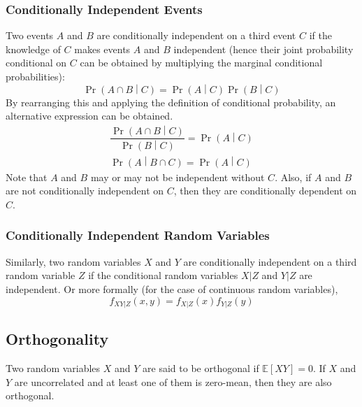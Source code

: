 \documentclass[11pt]{report} %
\begin{document}
\subsubsection{Conditionally Independent Events}
Two events $A$ and $B$ are conditionally independent on a third event $C$ if the knowledge of $C$ makes events $A$ and $B$ independent (hence their joint probability conditional on $C$ can be obtained by multiplying the marginal conditional probabilities):
\begin{equation}
\operatorname{Pr}\left(A\cap B\middle|C\right) = \operatorname{Pr}\left(A\middle|C\right)\operatorname{Pr}\left(B\middle|C\right)
\end{equation}
By rearranging this and applying the definition of conditional probability, an alternative expression can be obtained.
\begin{gather}
\dfrac{\operatorname{Pr}\left(A\cap B\middle|C\right)}{\operatorname{Pr}\left(B\middle|C\right)} = \operatorname{Pr}\left(A\middle|C\right) \\
\operatorname{Pr}\left(A\middle|B \cap C\right) = \operatorname{Pr}\left(A\middle|C\right)
\end{gather}
Note that $A$ and $B$ may or may not be independent without $C$. Also, if $A$ and $B$ are not conditionally independent on $C$, then they are conditionally dependent on $C$.

\subsubsection{Conditionally Independent Random Variables}

Similarly, two random variables $X$ and $Y$ are conditionally independent on a third random variable $Z$ if the conditional random variables $X|Z$ and $Y|Z$ are independent. Or more formally (for the case of continuous random variables),
\begin{equation}
f_{XY|Z}\left(x, y\right) = f_{X|Z}\left(x\right)f_{Y|Z}\left(y\right)
\end{equation}



\subsection{Orthogonality \cite{Yates2005}}

Two random variables $X$ and $Y$ are said to be orthogonal if $\mathbb{E}\left[XY\right] = 0$. If $X$ and $Y$ are uncorrelated and at least one of them is zero-mean, then they are also orthogonal.
\end{document}
